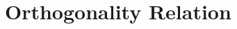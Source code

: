 \documentclass[amsmath,amssymb,14pt]{article}
\numberwithin{equation}{section}
\begin{document}








\section{Orthogonality Relation}
\end{document}
